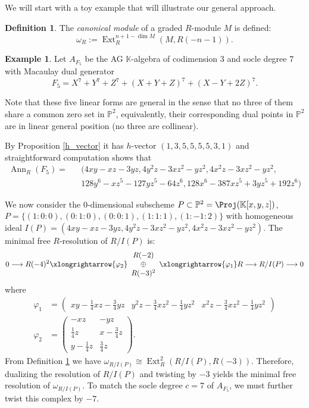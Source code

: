 \documentclass[12pt,twoside]{amsart}
\numberwithin{equation}{section} \hyphenation{semi-stable}
\newcommand {\PP}{\mathbb{P}}
\newcommand{\K}{\mathbb{K}}
\DeclareMathOperator{\ann}{Ann}
\DeclareMathOperator{\Ext}{Ext}
\theoremstyle{definition}
\newtheorem{definition}[theorem]{Definition}
\newtheorem{example}[theorem]{Example}
\begin{document}
We will start with a toy example that will illustrate our general approach.
\begin{definition}\label{canonicalmodule}
    The {\em canonical module}  of a graded $R$-module $M$ is defined:
$$
\omega_R:=\Ext^{n+1-\dim M}_R(M,R(-n-1)).$$
    
\end{definition}
\begin{example}
Let $A_{F_5}$ be the AG $\K$-algebra of codimension 3 and socle degree 7 with Macaulay dual generator  $$F_5=X^7+Y^7+Z^7+(X+Y+Z)^7+(X-Y+2Z)^7.$$

Note that these five linear forms are general in the sense that no three of them share a common zero set in $\mathbb{P}^2$, equivalently, their corresponding dual points in $\mathbb{P}^2$ are in linear general position (no three are collinear).

By Proposition  \ref{h_vector}  it has $h$-vector $(1, 3, 5, 5, 5,5, 3,1)$ and  straightforward computation shows that 
\begin{eqnarray*}
    \ann_R(F_5) =  &&(4xy-xz-3yz,4y^2z-3xz^2-yz^2,4x^2z-3xz^2-yz^2,\\
    &&128y^6-
      xz^5-127yz^5-64z^6,128x^6-387xz^5+3yz^5+192z^6)
\end{eqnarray*}


We now consider the 0-dimensional subscheme $P\subset \PP^2=\Proj(\K[x,y,z])$, $P=\{(1:0:0),(0:1:0),(0:0:1),(1:1:1),(1:-1:2)\}$ with homogeneous ideal $I(P)=(4xy-xz-3yz, 4y^2z-3xz^2-yz^2, 4x^2z-3xz^2-yz^2)$.  The minimal free $R$-resolution of $R/I(P)$ is:
$$0 \longrightarrow R(-4)^2 \xlongrightarrow{\varphi_2} \begin{array}{c} R(-2) \\ \oplus \\ R(-3)^2 \end{array} \xlongrightarrow{\varphi_1} R \longrightarrow R/I(P) \longrightarrow 0$$
where
$$\begin{aligned}
\varphi_1 &=  \begin{pmatrix} xy - \frac{1}{4}xz - \frac{3}{4}yz & y^2z - \frac{3}{4}xz^2 - \frac{1}{4}yz^2 & x^2z - \frac{3}{4}xz^2 - \frac{1}{4}yz^2 \end{pmatrix}\\
\varphi_2 &= \begin{pmatrix} -xz & -yz \\ \frac{1}{4}z & x - \frac{3}{4}z \\ y - \frac{1}{4}z & \frac{3}{4}z \end{pmatrix}.
\end{aligned}$$
        From Definition  \ref{canonicalmodule} we have $\omega_{R/I(P)} \cong \operatorname{Ext}^2_R(R/I(P), R(-3))$. Therefore, dualizing the resolution of $R/I(P)$ and twisting by $-3$ yields the minimal free resolution of $\omega_{R/I(P)}$. To match the socle degree $c = 7$ of $A_{F_5}$, we must further twist this complex by $-7$. 
        

\end{example}
\end{document}
